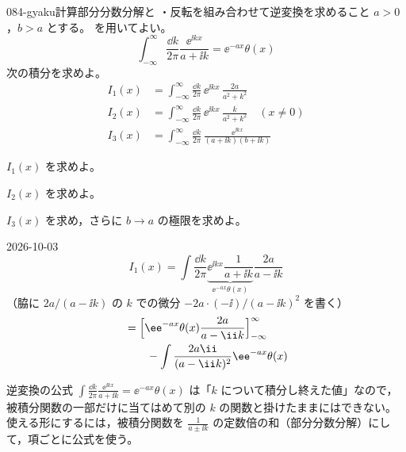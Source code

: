 \documentclass[uplatex,dvipdfmx,a4paper,11pt]{jsarticle}
\begin{document}
\begin{mondai}{084-gyaku}{計算}{部分分数分解と ・反転を組み合わせて逆変換を求めること}
$a>0$，$b>a$ とする。 を用いてよい。
  \[ \int_{-\infty}^{\infty}\frac{\dd k}{2\pi}\frac{\ee^{\ii kx}}{a+\ii k}=\ee^{-ax}\theta(x) \]
  次の積分を求めよ。
  \begin{align*}
    I_1(x)&=\int_{-\infty}^{\infty}\frac{\dd k}{2\pi}\,\ee^{\ii kx}\,\frac{2a}{a^{2}+k^{2}}\\
    I_2(x)&=\int_{-\infty}^{\infty}\frac{\dd k}{2\pi}\,\ee^{\ii kx}\,\frac{k}{a^{2}+k^{2}}\quad(x\neq0)\\
    I_3(x)&=\int_{-\infty}^{\infty}\frac{\dd k}{2\pi}\,\frac{\ee^{\ii kx}}{(a+\ii k)(b+\ii k)}
  \end{align*}
  \begin{shoumon}
    \item $I_1(x)$ を求めよ。
    \item $I_2(x)$ を求めよ。
    \item $I_3(x)$ を求め，さらに $b\to a$ の極限を求めよ。
  \end{shoumon}
\begin{kotaeutsushi}{2026-10-03}
\[ I_1(x)=\int\frac{\dd k}{2\pi}\underbrace{\ee^{\ii kx}\frac{1}{a+\ii k}}_{\ee^{-ax}\theta(x)}\frac{2a}{a-\ii k} \]
（脇に $2a/(a-\ii k)$ の $k$ での微分 $-2a\cdot(-\ii)/(a-\ii k)^{2}$ を書く）
\begin{align*}
  &=\Bigl[\ee^{-ax}\theta(x)\frac{2a}{a-\ii k}\Bigr]_{-\infty}^{\infty}\\
  &\qquad-\int\frac{2a\ii}{(a-\ii k)^{2}}\ee^{-ax}\theta(x)
\end{align*}
\mikai
{}
\mikai
\end{kotaeutsushi}
\begin{kizuki}
\item 逆変換の公式 $\int\frac{\dd k}{2\pi}\frac{\ee^{\ii kx}}{a+\ii k}=\ee^{-ax}\theta(x)$ は「$k$ について積分し終えた値」なので，被積分関数の一部だけに当てはめて別の $k$ の関数と掛けたままにはできない。使える形にするには，被積分関数を $\frac{1}{a\pm\ii k}$ の定数倍の和（部分分数分解）にして，項ごとに公式を使う。

\end{kizuki}
\end{mondai}
\end{document}
